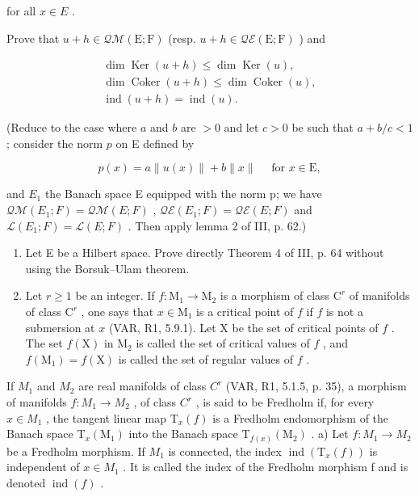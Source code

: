 for all \(x \in E\) .

Prove that \(u + h \in \mathcal{Q}\mathcal{M}(\mathrm{E};\mathrm{F})\) (resp. \(u + h \in \mathcal{Q}\mathcal{E}(\mathrm{E};\mathrm{F})\) ) and

\[
\begin{array}{c} \dim \operatorname{Ker} (u + h) \leqslant \dim \operatorname{Ker} (u), \\ \dim \operatorname{Coker} (u + h) \leqslant \dim \operatorname{Coker} (u), \\ \operatorname{ind} (u + h) = \operatorname{ind} (u). \end{array}
\]

(Reduce to the case where \(a\) and \(b\) are \(>0\) and let \(c > 0\) be such that \(a + b/c < 1\) ; consider the norm \(p\) on E defined by

\[
p (x) = a \| u (x) \| + b \| x \| \quad \text {   for   } x \in \mathrm{E},
\]

and \(E_{1}\) the Banach space E equipped with the norm p; we have \(\mathcal{Q}\mathcal{M}(E_{1};F)=\mathcal{Q}\mathcal{M}(E;F)\) , \(\mathcal{Q}\mathcal{E}(E_{1};F)=\mathcal{Q}\mathcal{E}(E;F)\) and \(\mathcal{L}(E_{1};F)=\mathcal{L}(E;F)\) . Then apply lemma 2 of III, p. 62.)

\begin{enumerate}
\def\labelenumi{\arabic{enumi})}
\setcounter{enumi}{7}
\item
  Let E be a Hilbert space. Prove directly Theorem 4 of III, p. 64 without using the Borsuk--Ulam theorem.
\item
  Let \(r \geqslant 1\) be an integer. If \(f: \mathrm{M}_1 \to \mathrm{M}_2\) is a morphism of class \(\mathrm{C}^r\) of manifolds of class \(\mathrm{C}^r\) , one says that \(x \in \mathrm{M}_1\) is a critical point of \(f\) if \(f\) is not a submersion at \(x\) (VAR, R1, 5.9.1). Let X be the set of critical points of \(f\) . The set \(f(\mathrm{X})\) in \(\mathrm{M}_2\) is called the set of critical values of \(f\) , and \(f(\mathrm{M}_1) = f(\mathrm{X})\) is called the set of regular values of \(f\) .
\end{enumerate}

If \(M_{1}\) and \(M_{2}\) are real manifolds of class \(C^{r}\) (VAR, R1, 5.1.5, p. 35), a morphism of manifolds \(f: M_{1} \to M_{2}\) , of class \(C^{r}\) , is said to be Fredholm if, for every \(x \in M_{1}\) , the tangent linear map \(\mathrm{T}_{x}(f)\) is a Fredholm endomorphism of the Banach space \(\mathrm{T}_{x}(\mathrm{M}_{1})\) into the Banach space \(\mathrm{T}_{f(x)}(\mathrm{M}_{2})\) . a) Let \(f: M_{1} \to M_{2}\) be a Fredholm morphism. If \(M_{1}\) is connected, the index \(\operatorname{ind}(\mathrm{T}_{x}(f))\) is independent of \(x \in M_{1}\) . It is called the index of the Fredholm morphism f and is denoted \(\operatorname{ind}(f)\) .

